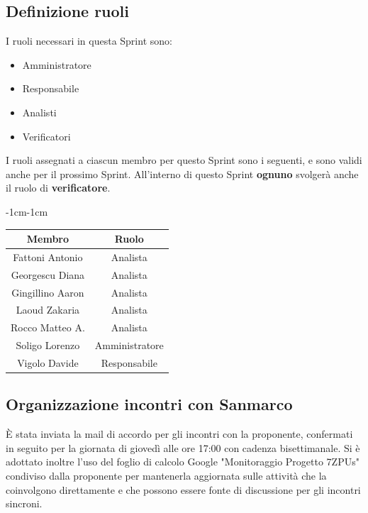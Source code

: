 \documentclass[a4paper,12pt]{article}
\begin{document}
\subsection{Definizione ruoli}
I ruoli necessari in questa Sprint sono:
\begin{itemize}[noitemsep]
    \item Amministratore
    \item Responsabile
    \item Analisti
    \item Verificatori
\end{itemize}

\noindent I ruoli assegnati a ciascun membro per questo Sprint sono i seguenti, e sono validi anche per il prossimo Sprint. All'interno di questo Sprint \textbf{ognuno} svolgerà anche il ruolo di \textbf{verificatore}.
\begin{table}[H]
    \begin{adjustwidth}{-1cm}{-1cm}
    \centering
\begin{tabular}{|c|c|}
    \hline
    \textbf{Membro} & \textbf{Ruolo} \\
    \hline
    Fattoni Antonio & Analista\\
    \hline
    Georgescu Diana & Analista\\
    \hline
    Gingillino Aaron& Analista\\
    \hline
    Laoud Zakaria & Analista\\
    \hline
    Rocco Matteo A. & Analista\\
    \hline
    Soligo Lorenzo & Amministratore\\
    \hline
    Vigolo Davide & Responsabile\\
    \hline
\end{tabular}
    \end{adjustwidth}
\end{table}

\subsection{Organizzazione incontri con Sanmarco}
È stata inviata la mail di accordo per gli incontri con la proponente, confermati in seguito per la giornata di giovedì alle ore 17:00 con cadenza bisettimanale. Si è adottato inoltre l'uso del foglio di calcolo Google "Monitoraggio Progetto 7ZPUs" condiviso dalla proponente per mantenerla aggiornata sulle attività che la coinvolgono direttamente e che possono essere fonte di discussione per gli incontri sincroni.
\end{document}
